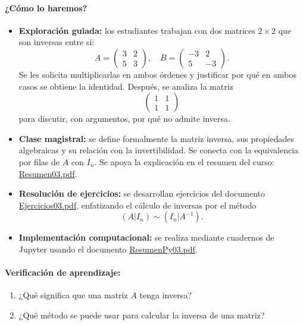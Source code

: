 \documentclass[a4,11pt]{aleph-notas}
\begin{document}
\paragraph{¿Cómo lo haremos?}
\begin{itemize}[leftmargin=*]
    \item \textbf{Exploración guiada:} los estudiantes trabajan con dos matrices $2\times 2$ que son inversas entre sí:
    \[
        A = \begin{pmatrix}
            3 & 2 \\
            5 & 3
        \end{pmatrix},\quad
        B = \begin{pmatrix}
            -3 & 2 \\
            5 & -3
        \end{pmatrix}.
    \]
    Se les solicita multiplicarlas en ambos órdenes y justificar por qué en ambos casos se obtiene la identidad. Después, se analiza la matriz
    \[
        \begin{pmatrix}
            1 & 1 \\
            1 & 1
        \end{pmatrix}
    \]
    para discutir, con argumentos, por qué no admite inversa.
    \item \textbf{Clase magistral:} se define formalmente la matriz inversa, sus propiedades algebraicas y su relación con la invertibilidad. Se conecta con la equivalencia por filas de $A$ con $I_n$. Se apoya la explicación en el resumen del curso: \href{https://fcena-puce.github.io/AlgebraLineal-05-N0048/01Resumen/Resumen03.pdf}{Resumen03.pdf}.
    \item \textbf{Resolución de ejercicios:} se desarrollan ejercicios del documento \href{https://fcena-puce.github.io/AlgebraLineal-05-N0048/04Ejercicios/Ejercicios03.pdf}{Ejercicios03.pdf}, enfatizando el cálculo de inversas por el método
    \[
        (A|I_n)\sim(I_n|A^{-1}).
    \]
    \item \textbf{Implementación computacional:} se realiza mediante cuadernos de Jupyter usando el documento \href{https://fcena-puce.github.io/AlgebraLineal-05-N0048/02ResumenPython/ResumenPy03.pdf}{ResumenPy03.pdf}.
\end{itemize}

\paragraph{Verificación de aprendizaje:}
\begin{enumerate}[leftmargin=*]
    \item ¿Qué significa que una matriz $A$ tenga inversa? 
    \item ¿Qué método se puede usar para calcular la inversa de una matriz?
\end{enumerate}
\end{document}
